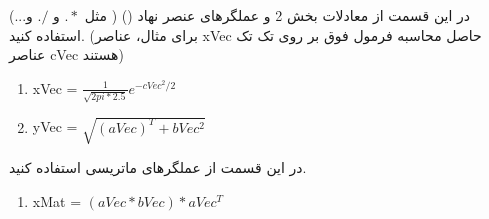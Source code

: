 \documentclass{article}
\begin{document}

در این قسمت از معادلات بخش 2 و عملگرهای عنصر نهاد
()
 ( مثل $.*$ و $./$ و...) استفاده کنید. (برای مثال، عناصر xVec حاصل محاسبه فرمول فوق بر روی تک تک عناصر cVec هستند)
\begin{latin}
	\begin{enumerate}
		\item xVec = {\LARGE${\frac{1}{\sqrt{2pi * 2.5}}}e^{{-cVec^2}/2}$}
		\item yVec = $\sqrt{(aVec)^T + bVec^2}$
	\end{enumerate}
\end{latin}

در این قسمت از عملگرهای ماتریسی استفاده کنید.
\begin{latin}
	\begin{enumerate}
		\item xMat = $(aVec * bVec) * aVec^T$
	\end{enumerate}
\end{latin}
\end{document}
